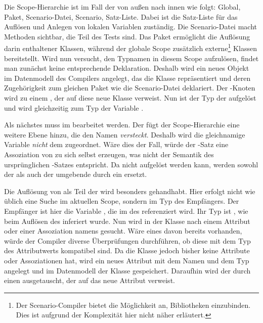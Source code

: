 Die Scope-Hierarchie ist im Fall der  von außen nach innen wie folgt:
Global, Paket, Scenario-Datei, Scenario, Satz-Liste.
Dabei ist die Satz-Liste für das Auflösen und Anlegen von lokalen Variablen zuständig.
Die Scenario-Datei macht Methoden sichtbar, die Teil des Tests sind.
Das Paket ermöglicht die Auflösung darin enthaltener Klassen, während der globale Scope zusätzlich externe\footnote{Der Scenario-Compiler bietet die Möglichkeit an, Bibliotheken einzubinden.
Dies ist aufgrund der Komplexität hier nicht näher erläutert.} Klassen bereitstellt.
Wird nun versucht, den Typnamen  in diesem Scope aufzulösen, findet man zunächst keine entsprechende Deklaration.
Deshalb wird ein neues Objekt im Datenmodell des Compilers angelegt, das die Klasse  repräsentiert und deren Zugehörigkeit zum gleichen Paket wie die Scenario-Datei deklariert.
Der -Knoten wird zu einem , der auf diese neue Klasse verweist.
Nun ist der Typ der  aufgelöst und wird gleichzeitig zum Typ der Variable .

Als nächstes muss  im  bearbeitet werden.
Der  fügt der Scope-Hierarchie eine weitere Ebene hinzu, die den Namen  \emph{versteckt}.
Deshalb wird die gleichnamige Variable \emph{nicht} dem  zugeordnet.
Wäre dies der Fall, würde der -Satz eine Assoziation von  zu sich selbst erzeugen, was nicht der Semantik des ursprünglichen -Satzes entspricht.
Da  nicht aufgelöst werden kann, werden sowohl der  als auch der umgebende  durch ein  ersetzt.

Die Auflösung von  als Teil der  wird besonders gehandhabt.
Hier erfolgt nicht wie üblich eine Suche im aktuellen Scope, sondern im Typ des Empfängers.
Der Empfänger ist hier die Variable , die im  des  referenziert wird.
Ihr Typ ist , wie beim Auflösen des  inferiert wurde.
Nun wird in der Klasse  nach einem Attribut oder einer Assoziation namens  gesucht.
Wäre eines davon bereits vorhanden, würde der Compiler diverse Überprüfungen durchführen, ob diese mit dem Typ des Attributwerts kompatibel sind.
Da die Klasse  jedoch bisher keine Attribute oder Assoziationen hat, wird ein neues Attribut mit dem Namen  und dem Typ  angelegt und im Datenmodell der Klasse  gespeichert.
Daraufhin wird der  durch einen  ausgetauscht, der auf das neue Attribut verweist.

